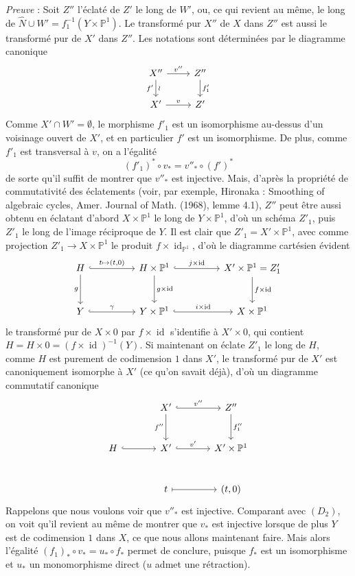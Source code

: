 \documentclass[11pt]{article}
\begin{document}
\emph{Preuve} : Soit $Z''$ l'éclaté de $Z'$ le long de $W'$, ou, ce qui revient au même, le long de $\widehat N\cup W'=f_1^{-1}(Y\times\mathbb P^1)$. Le transformé pur $X''$ de $X$ dans $Z''$ est aussi le transformé pur de $X'$ dans $Z''$. Les notations sont déterminées par le diagramme canonique
\[
\begin{tikzcd}
X''\arrow[r,"v''"]\arrow[d,"f'"',"\wr"]&Z''\arrow[d,"f'_1"]\\
X'\arrow[r,"v"]&Z'
\end{tikzcd}
\]
Comme $X'\cap W'=\emptyset$, le morphisme $f'_1$ est un isomorphisme au-dessus d'un voisinage ouvert de $X'$, et en particulier $f'$ est un isomorphisme. De plus, comme $f'_1$ est transversal à $v$, on a l'égalité
\[
(f'_1)^*\circ v_*=v''_*\circ(f')^*
\tag{9.8.8}
\]
de sorte qu'il suffit de montrer que $v''_*$ est injective. Mais, d'après la propriété de commutativité des éclatements (voir, par exemple, Hironaka : Smoothing of algebraic cycles, Amer. Journal of Math. (1968), lemme 4.1), $Z''$ peut être aussi obtenu en éclatant d'abord $X\times\mathbb P^1$ le long de $Y\times\mathbb P^1$, d'où un schéma $Z'_1$, puis $Z'_1$ le long de l'image réciproque de $Y$. Il est clair que $Z'_1=X'\times\mathbb P^1$, avec comme projection $Z'_1\to X\times\mathbb P^1$ le produit $f\times\operatorname{id}_{\mathbb P^1}$, d'où le diagramme cartésien évident
\[
\begin{tikzcd}[column sep=huge,row sep=large]
H\arrow[r,hook,"{t\mapsto(t,0)}"]\arrow[d,"g"']&H\times\mathbb P^1\arrow[r,hook,"{j\times\operatorname{id}}"]\arrow[d,"{g\times\operatorname{id}}"]&X'\times\mathbb P^1=Z'_1\arrow[d,"{f\times\operatorname{id}}"]\\
Y\arrow[r,hook,"\gamma"]&Y\times\mathbb P^1\arrow[r,hook,"{i\times\operatorname{id}}"]&X\times\mathbb P^1
\end{tikzcd}
\]
le transformé pur de $X\times0$ par $f\times\operatorname{id}$ s'identifie à $X'\times0$, qui contient $H=H\times0=(f\times\operatorname{id})^{-1}(Y)$. Si maintenant on éclate $Z'_1$ le long de $H$, comme $H$ est purement de codimension $1$ dans $X'$, le transformé pur de $X'$ est canoniquement isomorphe à $X'$ (ce qu'on savait déjà), d'où un diagramme commutatif canonique
\[
\begin{tikzcd}[column sep=large,row sep=large]
&X'\arrow[r,hook,"v''"]\arrow[d,"f''"']&Z''\arrow[d,"f''_1"]\\
H\arrow[r,hook]&X'\arrow[r,hook,"v'"]&X'\times\mathbb P^1\\
&t\arrow[r,mapsto]&{(t,0)}
\end{tikzcd}
\]
Rappelons que nous voulons voir que $v''_*$ est injective. Comparant avec $(D_2)$, on voit qu'il revient au même de montrer que $v_*$ est injective lorsque de plus $Y$ est de codimension $1$ dans $X$, ce que nous allons maintenant faire. Mais alors l'égalité $(f_1)_*\circ v_*=u_*\circ f_*$ permet de conclure, puisque $f_*$ est un isomorphisme et $u_*$ un monomorphisme direct ($u$ admet une rétraction).
\end{document}
